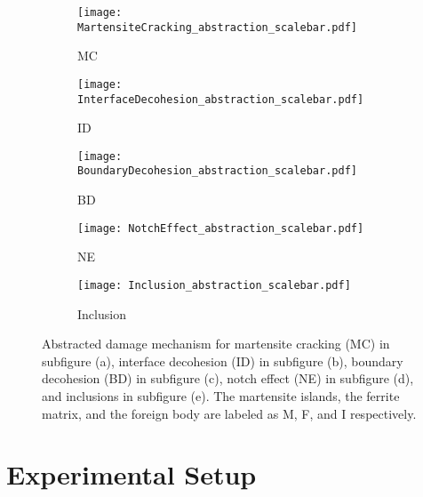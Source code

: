 
\begin{figure}
\begin{subfigure}{.2\textwidth}
\centering
  \texttt{[image: MartensiteCracking\_abstraction\_scalebar.pdf]}
  \caption{MC}
  \label{fig:MC}
\end{subfigure}%
\begin{subfigure}{.2\textwidth}
\centering
  \texttt{[image: InterfaceDecohesion\_abstraction\_scalebar.pdf]}
  \caption{ID}
  \label{fig:Interface_scalebar}
\end{subfigure}%
\centering
\begin{subfigure}{.2\textwidth}
\centering
  \texttt{[image: BoundaryDecohesion\_abstraction\_scalebar.pdf]}
  \caption{BD}
  \label{fig:Inclusion_scalebar}
\end{subfigure}%
\begin{subfigure}{.2\textwidth}
\centering
  \texttt{[image: NotchEffect\_abstraction\_scalebar.pdf]}
  \caption{NE}
  \label{fig:Notch_scalebar}
\end{subfigure}%
\centering
\begin{subfigure}{.2\textwidth}
\centering
  \texttt{[image: Inclusion\_abstraction\_scalebar.pdf]}
  \caption{Inclusion}
  \label{fig:Inclusion_scalebar}
\end{subfigure}%
\caption{Abstracted damage mechanism for martensite cracking (MC) in subfigure (a), interface decohesion (ID) in subfigure (b), boundary decohesion (BD) in subfigure (c), notch effect (NE) in subfigure (d), and inclusions in subfigure (e). The martensite islands, the ferrite matrix, and the foreign body are labeled as M, F, and I respectively.}
\label{fig:DamageCategories_abstraction}
\end{figure}

\section{Experimental Setup}

